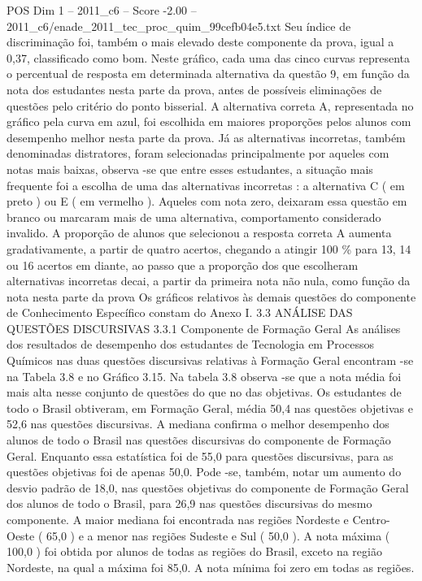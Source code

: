 \begin{textsample}{POS Dim 1 – 2011\_c6 – Score -2.00 – 2011\_c6/enade\_2011\_tec\_proc\_quim\_99cefb04e5.txt}
Seu índice de discriminação foi, também o mais elevado deste componente da prova, igual a 0,37, classificado como bom.
Neste gráfico, cada uma das cinco curvas representa o percentual de resposta em determinada alternativa da questão 9, em função da nota dos estudantes nesta parte da prova, antes de possíveis eliminações de questões pelo critério do ponto bisserial.
A alternativa correta A, representada no gráfico pela curva em azul, foi escolhida em maiores proporções pelos alunos com desempenho melhor nesta parte da prova.
Já as alternativas incorretas, também denominadas distratores, foram selecionadas principalmente por aqueles com notas mais baixas, observa -se que entre esses estudantes, a situação mais frequente foi a escolha de uma das alternativas incorretas : a alternativa C ( em preto ) ou E ( em vermelho ).
Aqueles com nota zero, deixaram essa questão em branco ou marcaram mais de uma alternativa, comportamento considerado invalido.
A proporção de alunos que selecionou a resposta correta A aumenta gradativamente, a partir de quatro acertos, chegando a atingir 100 \% para 13, 14 ou 16 acertos em diante, ao passo que a proporção dos que escolheram alternativas incorretas decai, a partir da primeira nota não nula, como função da nota nesta parte da prova Os gráficos relativos às demais questões do componente de Conhecimento Específico constam do Anexo I. 3.3 ANÁLISE DAS QUESTÕES DISCURSIVAS 3.3.1 Componente de Formação Geral As análises dos resultados de desempenho dos estudantes de Tecnologia em Processos Químicos nas duas questões discursivas relativas à Formação Geral encontram -se na Tabela 3.8 e no Gráfico 3.15.
Na tabela 3.8 observa -se que a nota média foi mais alta nesse conjunto de questões do que no das objetivas.
Os estudantes de todo o Brasil obtiveram, em Formação Geral, média 50,4 nas questões objetivas e 52,6 nas questões discursivas.
A mediana confirma o melhor desempenho dos alunos de todo o Brasil nas questões discursivas do componente de Formação Geral.
Enquanto essa estatística foi de 55,0 para questões discursivas, para as questões objetivas foi de apenas 50,0.
Pode -se, também, notar um aumento do desvio padrão de 18,0, nas questões objetivas do componente de Formação Geral dos alunos de todo o Brasil, para 26,9 nas questões discursivas do mesmo componente.
A maior mediana foi encontrada nas regiões Nordeste e Centro-Oeste ( 65,0 ) e a menor nas regiões Sudeste e Sul ( 50,0 ).
A nota máxima ( 100,0 ) foi obtida por alunos de todas as regiões do Brasil, exceto na região Nordeste, na qual a máxima foi 85,0.
A nota mínima foi zero em todas as regiões.

\end{textsample}
